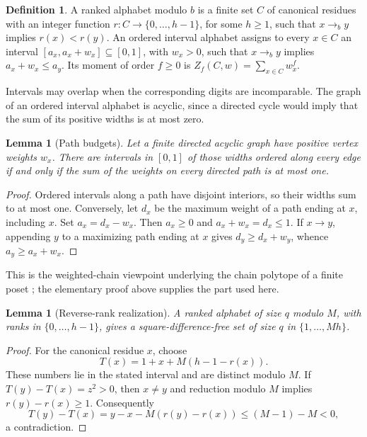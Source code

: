 \documentclass[11pt]{article}
\newtheorem{lemma}[theorem]{Lemma}
\theoremstyle{definition}
\newtheorem{definition}[theorem]{Definition}
\theoremstyle{remark}
\begin{document}
\begin{definition}
A ranked alphabet modulo $b$ is a finite set $C$ of canonical residues
with an integer function $r:C\to\{0,\ldots,h-1\}$, for some $h\ge1$,
such that $x\to_b y$ implies $r(x)<r(y)$.
An ordered interval alphabet assigns to every $x\in C$ an interval
$[a_x,a_x+w_x]\subseteq[0,1]$, with $w_x>0$, such that
$x\to_b y$ implies $a_x+w_x\le a_y$.
Its moment of order $f\ge0$ is $Z_f(C,w)=\sum_{x\in C}w_x^f$.
\end{definition}

Intervals may overlap when the corresponding digits are incomparable. The
graph of an ordered interval alphabet is acyclic, since a directed cycle
would imply that the sum of its positive widths is at most zero.

\begin{lemma}[Path budgets]\label{lem:paths}
Let a finite directed acyclic graph have positive vertex weights $w_x$.
There are intervals in $[0,1]$ of those widths ordered along every edge
if and only if the sum of the weights on every directed path is at most one.
\end{lemma}
\begin{proof}
Ordered intervals along a path have disjoint interiors, so their widths
sum to at most one. Conversely, let $d_x$ be the maximum weight of a path
ending at $x$, including $x$. Set $a_x=d_x-w_x$. Then $a_x\ge0$ and
$a_x+w_x=d_x\le1$. If $x\to y$, appending $y$ to a maximizing path ending
at $x$ gives $d_y\ge d_x+w_y$, whence $a_y\ge a_x+w_x$.
\end{proof}
This is the weighted-chain viewpoint underlying the chain polytope of a
finite poset \cite{Stanley1986}; the elementary proof above supplies the
part used here.

\begin{lemma}[Reverse-rank realization]\label{lem:reverse}
A ranked alphabet of size $q$ modulo $M$, with ranks in
$\{0,\ldots,h-1\}$, gives a square-difference-free set of size $q$ in
$\{1,\ldots,Mh\}$.
\end{lemma}
\begin{proof}
For the canonical residue $x$, choose
\[
 T(x)=1+x+M(h-1-r(x)).
\]
These numbers lie in the stated interval and are distinct modulo $M$.
If $T(y)-T(x)=z^2>0$, then $x\ne y$ and reduction modulo $M$ implies
$r(y)-r(x)\ge1$. Consequently
\[
 T(y)-T(x)=y-x-M(r(y)-r(x))\le(M-1)-M<0,
\]
a contradiction.
\end{proof}
\end{document}
